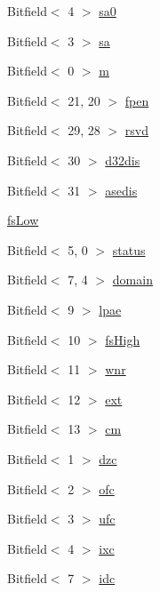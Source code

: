 \begin{DoxyCompactItemize}
\item 
Bitfield$<$ 4 $>$ \hyperlink{namespaceArmISA_af6191ae2c9400e759d7c07555161b8a6}{sa0}
\item 
Bitfield$<$ 3 $>$ \hyperlink{namespaceArmISA_a13cb6ab00c171f7ae38987d4e1342d75}{sa}
\item 
Bitfield$<$ 0 $>$ \hyperlink{namespaceArmISA_afb747b54d0c5e3e4e1763be19ca9373b}{m}
\item 
Bitfield$<$ 21, 20 $>$ \hyperlink{namespaceArmISA_a963c822ad6f9ccf9cf73d2f40b958468}{fpen}
\item 
Bitfield$<$ 29, 28 $>$ \hyperlink{namespaceArmISA_a4f1efd471a034a69e91b842e2dee30b6}{rsvd}
\item 
Bitfield$<$ 30 $>$ \hyperlink{namespaceArmISA_ad339120d39fbe76bfcaca714fa5ea591}{d32dis}
\item 
Bitfield$<$ 31 $>$ \hyperlink{namespaceArmISA_aedab74d9ce599352108b660ee38a6b9c}{asedis}
\item 
\hyperlink{namespaceArmISA_a56fa66f03c771d82f9e5bf36a12a6625}{fsLow}
\item 
Bitfield$<$ 5, 0 $>$ \hyperlink{namespaceArmISA_a566327436c4c7e7a63ab9ac137e9d50e}{status}
\item 
Bitfield$<$ 7, 4 $>$ \hyperlink{namespaceArmISA_ad0cc3566b56b49851f0996cbbe5000cf}{domain}
\item 
Bitfield$<$ 9 $>$ \hyperlink{namespaceArmISA_ad3a840ce7ba10a7ca2515456d3c299a4}{lpae}
\item 
Bitfield$<$ 10 $>$ \hyperlink{namespaceArmISA_acc684b12953b738f51b5cfeffa840c48}{fsHigh}
\item 
Bitfield$<$ 11 $>$ \hyperlink{namespaceArmISA_a81a7ce3d0e0116cff30b3b480d767cc5}{wnr}
\item 
Bitfield$<$ 12 $>$ \hyperlink{namespaceArmISA_a75c8faae0fc49ac3aec956c53d2ebf36}{ext}
\item 
Bitfield$<$ 13 $>$ \hyperlink{namespaceArmISA_a0fa615f99a2d65adc4911677a3137b4d}{cm}
\item 
Bitfield$<$ 1 $>$ \hyperlink{namespaceArmISA_af71d9a47f5c3d1b41fcf3fe69aa3d28e}{dzc}
\item 
Bitfield$<$ 2 $>$ \hyperlink{namespaceArmISA_af305d8be8f5d363949e58751e822f2d0}{ofc}
\item 
Bitfield$<$ 3 $>$ \hyperlink{namespaceArmISA_acd27c9e82e4ef6c73f452095a73c59b6}{ufc}
\item 
Bitfield$<$ 4 $>$ \hyperlink{namespaceArmISA_a36cd269e73565ba5ca7b1185ff9889fc}{ixc}
\item 
Bitfield$<$ 7 $>$ \hyperlink{namespaceArmISA_adce8ebc02412db2979a21ce1843931bc}{idc}

\end{DoxyCompactItemize}
